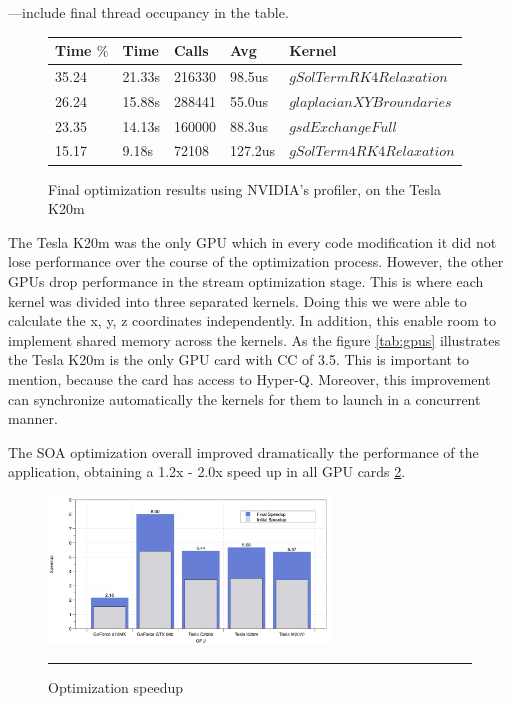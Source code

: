 ---include final thread occupancy in the table.

\begin{figure}[htbp]
	\centering
	  \begin{tabular} { |  l  |  l | l  | l | l |}
	      \hline
	    Time $\%$& Time & Calls & Avg & Kernel \\
    \hline
   35.24 & 21.33s & 216330 & 98.5us & $gSolTermRK4Relaxation$ \\
   \hline
   26.24 & 15.88s & 288441 & 55.0us & $glaplacianXYBroundaries$\\
   \hline
   23.35 & 14.13s & 160000 & 88.3us & $gsdExchangeFull$ \\
   \hline
   15.17 & 9.18s & 72108 & 127.2us & $gSolTerm4RK4Relaxation$\\ 
   \hline
    \end{tabular}
	\caption[Optimization results with the Profiler]{Final optimization results using NVIDIA's profiler, on the Tesla K20m}
	\label{fig:final}
\end{figure}
    
The Tesla K20m was the only GPU which in every code modification it did not lose performance over the course of the optimization process. However,  the other GPUs drop performance in the stream optimization stage. This is where each kernel was divided into three separated kernels. Doing this we were able to calculate the x, y, z coordinates independently. In addition, this enable room to implement shared memory across the kernels. As the figure \ref{tab:gpus} illustrates the Tesla K20m is the only GPU card with CC of 3.5. This is important to mention, because the card has access to Hyper-Q. Moreover, this improvement can synchronize automatically the kernels for them to launch in a concurrent manner. 

The SOA optimization overall improved dramatically the performance of the application, obtaining a 1.2x - 2.0x speed up in all GPU cards \ref{fig:speedup}.

\begin{figure}[htbp]
	\centering
		\includegraphics[width=0.67\textwidth]{Figures/speed.png}
		\rule{35em}{0.2pt}
	\caption[Optimization speedup overview]{Optimization speedup}
	\label{fig:speedup}
\end{figure}


